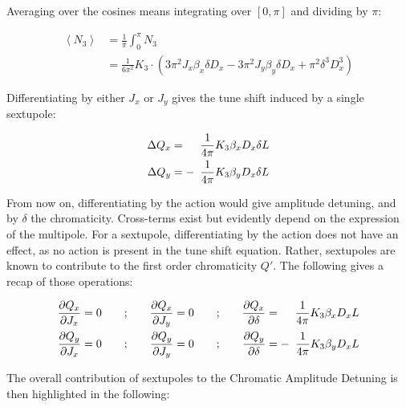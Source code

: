 Averaging over the cosines means integrating over $[0, \pi]$ and dividing by $\pi$:

\begin{equation}
  \begin{aligned}
  \left< N_3 \right> &= \frac{1}{\pi} \int_0^\pi N_3 \\
                     &= \frac{1}{6\pi^2} K_{3} \cdot \left(3 \pi^{2} J_{x} \beta_{x} \delta D_x - 3 \pi^{2} J_{y} \beta_{y} \delta D_x + \pi^{2} \delta^{3} D_x^{3}\right)
  \end{aligned}
\end{equation}

Differentiating by either $J_x$ or $J_y$ gives the tune shift induced by a single sextupole:

\begin{equation}
  \begin{aligned}
    \Delta Q_x &=             &&\frac{1}{4\pi} K_3 \beta_x D_x \delta L     \\
    \Delta Q_y &= -\mkern-9mu &&\frac{1}{4\pi} K_3 \beta_y D_x \delta L
  \end{aligned}
\end{equation}


From now on, differentiating by the action would give amplitude detuning, and by $\delta$ the
chromaticity. Cross-terms exist but evidently depend on the expression of the multipole.
For a sextupole, differentiating by the action does not have an effect, as no action is present in
the tune shift equation. Rather, sextupoles are known to contribute to the first order chromaticity
$Q'$. The following gives a recap of those operations:

\begin{equation}\begin{aligned}
  \frac{\partial Q_x}{\partial J_x} = 0 
      \quad&&;\quad&& \frac{\partial Q_x}{\partial J_y} = 0 
      \quad&&;\quad&& \frac{\partial Q_x}{\partial \delta} &= &\frac{1}{4\pi}K_3\beta_xD_x L \\
  \frac{\partial Q_y}{\partial J_x} = 0
    \quad&&;\quad&& \frac{\partial Q_y}{\partial J_y} = 0
    \quad&&;\quad&& \frac{\partial Q_y}{\partial \delta} &= -\mkern-9mu &\frac{1}{4\pi}K_3\beta_yD_x L \\
\end{aligned}\end{equation}

The overall contribution of sextupoles to the Chromatic Amplitude Detuning is then highlighted in
the following:

